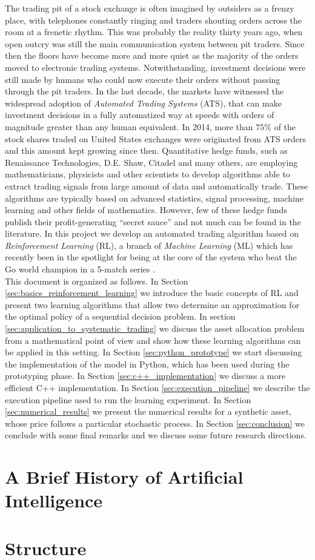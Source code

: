 The trading pit of a stock exchange is often imagined by outsiders as a frenzy place, with telephones constantly ringing and traders shouting orders across the room at a frenetic rhythm. This was probably the reality thirty years ago, when open outcry was still the main communication system between pit traders. Since then the floors have become more and more quiet as the majority of the orders moved to electronic trading systems. Notwithstanding, investment decisions were still made by humans who could now execute their orders without passing through the pit traders. In the last decade, the markets have witnessed the widespread adoption of \emph{Automated Trading Systems} (ATS), that can make investment decisions in a fully automatized way at speeds with orders of magnitude greater than any human equivalent. In 2014, more than $75\%$ of the stock shares traded on United States exchanges were originated from ATS orders and this amount kept growing since then. Quantitative hedge funds, such as Renaissance Technologies, D.E. Shaw, Citadel and many others, are employing mathematicians, physicists and other scientists to develop algorithms able to extract trading signals from large amount of data and automatically trade. These algorithms are typically based on advanced statistics, signal processing, machine learning and other fields of mathematics. However, few of these hedge funds publish their profit-generating ``secret sauce'' and not much can be found in the literature. In this project we develop an automated trading algorithm based on \emph{Reinforcement Learning} (RL), a branch of \emph{Machine Learning} (ML) which has recently been in the spotlight for being at the core of the system who beat the Go world champion in a 5-match series \cite{silver2016mastering}.\\
This document is organized as follows. In Section \ref{sec:basics_reinforcement_learning} we introduce the basic concepts of RL and present two learning algorithms that allow two determine an approximation for the optimal policy of a sequential decision problem. In section \ref{sec:application_to_systematic_trading} we discuss the asset allocation problem from a mathematical point of view and show how these learning algorithms can be applied in this setting. In Section \ref{sec:python_prototype} we start discussing the implementation of the model in Python, which has been used during the prototyping phase. In Section \ref{sec:c++_implementation} we discuss a more efficient C++ implementation. In Section \ref{sec:execution_pipeline} we describe the execution pipeline used to run the learning experiment. In Section \ref{sec:numerical_results} we present the numerical results for a synthetic asset, whose price follows a particular stochastic process. In Section \ref{sec:conclusion} we conclude with some final remarks and we discuss some future research directions. 



\section{A Brief History of Artificial Intelligence}

\section{Structure}